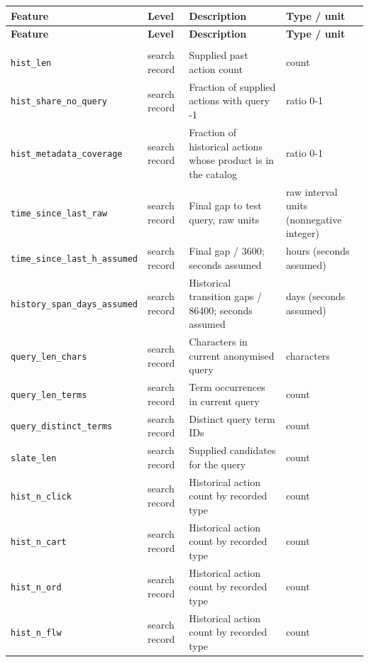 \documentclass[11pt,a4paper]{article}
\newcommand{\hd}[1]{\textbf{#1}}
\newcommand{\headrow}{}
\begin{document}
{\small
\setlength{\tabcolsep}{4pt}
\begin{longtable}{>{\raggedright\arraybackslash}p{3.7cm} >{\raggedright\arraybackslash}p{2.3cm} >{\raggedright\arraybackslash}p{6.0cm} >{\raggedright\arraybackslash}p{2.6cm}}
\toprule
\headrow \hd{Feature} & \hd{Level} & \hd{Description} & \hd{Type / unit} \\
\midrule
\endfirsthead
\toprule
\headrow \hd{Feature} & \hd{Level} & \hd{Description} & \hd{Type / unit} \\
\midrule
\endhead
\midrule
\multicolumn{4}{r}{\footnotesize\emph{continued on next page}} \\
\endfoot
\bottomrule
\endlastfoot
\texttt{hist\_len} & search record & Supplied past action count & count \\
\texttt{hist\_share\_no\_query} & search record & Fraction of supplied actions with query -1 & ratio 0-1 \\
\texttt{hist\_metadata\_coverage} & search record & Fraction of historical actions whose product is in the catalog & ratio 0-1 \\
\texttt{time\_since\_last\_raw} & search record & Final gap to test query, raw units & raw interval units (nonnegative integer) \\
\texttt{time\_since\_last\_h\_assumed} & search record & Final gap / 3600; seconds assumed & hours (seconds assumed) \\
\texttt{history\_span\_days\_assumed} & search record & Historical transition gaps / 86400; seconds assumed & days (seconds assumed) \\
\texttt{query\_len\_chars} & search record & Characters in current anonymised query & characters \\
\texttt{query\_len\_terms} & search record & Term occurrences in current query & count \\
\texttt{query\_distinct\_terms} & search record & Distinct query term IDs & count \\
\texttt{slate\_len} & search record & Supplied candidates for the query & count \\
\texttt{hist\_n\_click} & search record & Historical action count by recorded type & count \\
\texttt{hist\_n\_cart} & search record & Historical action count by recorded type & count \\
\texttt{hist\_n\_ord} & search record & Historical action count by recorded type & count \\
\texttt{hist\_n\_flw} & search record & Historical action count by recorded type & count \\

\end{longtable}}
\end{document}
